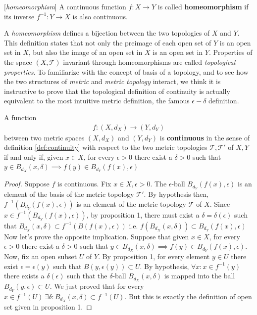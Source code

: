 \begin{definition}{[\textit{homeomorphism}]}
	A continuous function $f : X \rightarrow Y$ is called \textbf{homeomorphism} if its inverse $f^{-1}: Y \rightarrow X$ is also continuous.
\end{definition}
A \textit{homeomorphism} defines a bijection between the two topologies of $X$ and $Y$. This definition states that not only the preimage of each open set of $Y$ is an open set in $X$, but also the image of an open set in $X$ is an open set in $Y$.   Properties of the space $(X,\mathcal{T})$ invariant through homeomorphisms are called \textit{topological properties}.
To familiarize with the concept of basis of a topology, and to see how the two structures of \textit{metric} and \textit{metric topology} interact, we think it is instructive to prove that the topological definition of continuity is actually equivalent to the most intuitive metric definition, the famous $\epsilon-\delta$ definition.
\begin{lemma}
	A function
	\begin{align*}
	f:(X,d_X) \rightarrow (Y,d_Y)
	\end{align*}
	between two metric spaces $(X,d_X)$ and $(Y,d_Y)$ is \textbf{continuous} in the sense of definition \ref{def:continuity} with respect to the two metric topologies $\mathcal{T}, \mathcal{T}'$ of $X, Y$ if and only if, given $x \in X$,   for every $\epsilon > 0$ there exist a $\delta > 0$ such that $y\in B_{d_X}(x,\delta) \implies f(y)\in B_{d_Y}(f(x),\epsilon)$
	\label{theo:continuity}
\end{lemma}
\begin{proof}
	Suppose $f$ is continuous. Fix $x \in X, \epsilon > 0$. The $\epsilon$-ball $B_{d_Y}(f(x),\epsilon)$ is an element of the basis of the metric topology $\mathcal{T}'$. By hypothesis then, $f^{-1}(B_{d_Y}(f(x),\epsilon))$  is an element of the metric topology $\mathcal{T}$ of $X$. Since $x \in f^{-1}(B_{d_Y}(f(x),\epsilon))$, by proposition 1, there must exist a $\delta=\delta(\epsilon)$ such that $B_{d_X}(x,\delta) \subset f^{-1}(B(f(x),\epsilon))$ i.e. $f(B_{d_X}(x,\delta)) \subset B_{d_Y}(f(x),\epsilon)$ \newline
	Now let's prove the opposite implication. Suppose that given $x \in X$,   for every $\epsilon > 0$ there exist a $\delta > 0$ such that $y\in B_{d_X}(x,\delta) \implies f(y)\in B_{d_Y}(f(x),\epsilon)$. Now, fix an open subset $U$ of $Y$.  By proposition 1, for every element $y \in U$ there exist $\epsilon=\epsilon(y)$ such that $B(y,\epsilon(y)) \subset U$. By hypothesis, $\forall x : x \in f^{-1}(y)$ there exists a $\delta(\epsilon)$ such that the $\delta$-ball $B_{d_X}(x,\delta)$ is mapped into the ball $B_{d_Y}(y,\epsilon) \subset U$. We just proved that for every $x\in f^{-1}(U) \ \exists \delta: B_{d_X}(x,\delta)\subset f^{-1}(U)$. But this is exactly the definition of open set given in proposition 1.
\end{proof}

